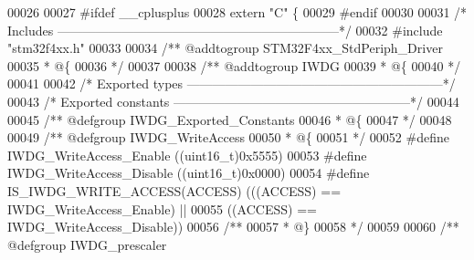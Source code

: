 \begin{DoxyCode}
00026 
00027 \textcolor{preprocessor}{#}\textcolor{preprocessor}{ifdef} \_\_cplusplus
00028  \textcolor{keyword}{extern} \textcolor{stringliteral}{"C"} \{
00029 \textcolor{preprocessor}{#}\textcolor{preprocessor}{endif}
00030 
00031 \textcolor{comment}{/* Includes ------------------------------------------------------------------*/}
00032 \textcolor{preprocessor}{#}\textcolor{preprocessor}{include} "stm32f4xx.h"
00033 
00034 \textcolor{comment}{/** @addtogroup STM32F4xx\_StdPeriph\_Driver}
00035 \textcolor{comment}{  * @\{}
00036 \textcolor{comment}{  */}
00037 
00038 \textcolor{comment}{/** @addtogroup IWDG}
00039 \textcolor{comment}{  * @\{}
00040 \textcolor{comment}{  */}
00041 
00042 \textcolor{comment}{/* Exported types ------------------------------------------------------------*/}
00043 \textcolor{comment}{/* Exported constants --------------------------------------------------------*/}
00044 
00045 \textcolor{comment}{/** @defgroup IWDG\_Exported\_Constants}
00046 \textcolor{comment}{  * @\{}
00047 \textcolor{comment}{  */}
00048 
00049 \textcolor{comment}{/** @defgroup IWDG\_WriteAccess}
00050 \textcolor{comment}{  * @\{}
00051 \textcolor{comment}{  */}
00052 \textcolor{preprocessor}{#}\textcolor{preprocessor}{define} \textcolor{preprocessor}{IWDG\_WriteAccess\_Enable}     \textcolor{preprocessor}{(}\textcolor{preprocessor}{(}\textcolor{preprocessor}{uint16\_t}\textcolor{preprocessor}{)}0x5555\textcolor{preprocessor}{)}
00053 \textcolor{preprocessor}{#}\textcolor{preprocessor}{define} \textcolor{preprocessor}{IWDG\_WriteAccess\_Disable}    \textcolor{preprocessor}{(}\textcolor{preprocessor}{(}\textcolor{preprocessor}{uint16\_t}\textcolor{preprocessor}{)}0x0000\textcolor{preprocessor}{)}
00054 \textcolor{preprocessor}{#}\textcolor{preprocessor}{define} \textcolor{preprocessor}{IS\_IWDG\_WRITE\_ACCESS}\textcolor{preprocessor}{(}\textcolor{preprocessor}{ACCESS}\textcolor{preprocessor}{)} \textcolor{preprocessor}{(}\textcolor{preprocessor}{(}\textcolor{preprocessor}{(}\textcolor{preprocessor}{ACCESS}\textcolor{preprocessor}{)} \textcolor{preprocessor}{==} IWDG_WriteAccess_Enable\textcolor{preprocessor}{)} \textcolor{preprocessor}{||}
00055                                       \textcolor{preprocessor}{(}\textcolor{preprocessor}{(}\textcolor{preprocessor}{ACCESS}\textcolor{preprocessor}{)} \textcolor{preprocessor}{==} IWDG_WriteAccess_Disable\textcolor{preprocessor}{)}\textcolor{preprocessor}{)}
00056 \textcolor{comment}{/**}
00057 \textcolor{comment}{  * @\}}
00058 \textcolor{comment}{  */}
00059 
00060 \textcolor{comment}{/** @defgroup IWDG\_prescaler }

\end{DoxyCode}
